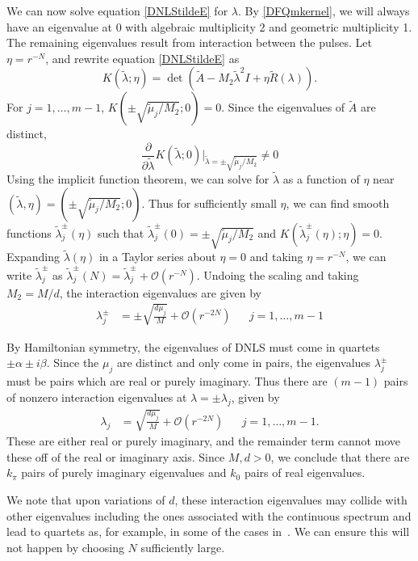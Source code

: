 \documentclass[12pt]{elsarticle}
\begin{document}
We can now solve equation \eqref{DNLStildeE} for $\lambda$. By \eqref{DFQmkernel}, we will always have an eigenvalue at 0 with algebraic multiplicity 2 and geometric multiplicity 1. The remaining eigenvalues result from interaction between the pulses. Let $\eta = r^{-N}$, and rewrite equation \eqref{DNLStildeE} as 
\begin{equation}\label{DNLStildeE2}
K(\tilde{\lambda}; \eta) = \det(\tilde{A} - M_2 \tilde{\lambda}^2 I + \eta \tilde{R}(\lambda)).
\end{equation}
For $j = 1, \dots, m-1$, $K(\pm \sqrt{\tilde{\mu}_j / M_2 }; 0) = 0$. Since the eigenvalues of $\tilde{A}$ are distinct, 
\[
\frac{\partial}{\partial \tilde{\lambda}} K(\tilde{\lambda}; 0)\Big|_{\tilde{\lambda} = \pm \sqrt{\tilde{\mu}_j / M_2 }} \neq 0
\]
Using the implicit function theorem, we can solve for $\tilde{\lambda}$ as a function of $\eta$ near $(\tilde{\lambda}, \eta) = (\pm \sqrt{\tilde{\mu}_j / M_2 }; 0)$. Thus for sufficiently small $\eta$, we can find smooth functions $\tilde{\lambda}_j^\pm(\eta)$ such that $\tilde{\lambda}_j^\pm(0) = \pm \sqrt{\tilde{\mu}_j / M_2 }$ and $K(\tilde{\lambda}_j^\pm(\eta); \eta) = 0$. Expanding $\tilde{\lambda}(\eta)$ in a Taylor series about $\eta = 0$ and taking $\eta = r^{-N}$, we can write $\tilde{\lambda}_j^\pm$ as $\tilde{\lambda}_j^\pm(N) = \tilde{\lambda}_j^\pm + \mathcal{O}(r^{-N})$. Undoing the scaling and taking $M_2 = M/d$, the interaction eigenvalues are given by
\begin{align*}
\lambda^\pm_j &= \pm \sqrt{\frac{d \mu_j}{M}} + \mathcal{O}(r^{-2N}) && j = 1, \dots, m-1 
\end{align*}

By Hamiltonian symmetry, the eigenvalues of DNLS must come in quartets $\pm \alpha \pm i \beta$. Since the $\mu_j$ are distinct and only come in pairs, the eigenvalues $\lambda_j^\pm$ must be pairs which are real or purely imaginary. Thus there are $(m - 1)$ pairs of nonzero interaction eigenvalues at $\lambda = \pm \lambda_j$, given by 
\begin{align*}
\lambda_j &= \sqrt{\frac{d \mu_j}{M}} + \mathcal{O}(r^{-2N}) && j = 1, \dots, m-1.
\end{align*}
These are either real or purely imaginary, and the remainder term cannot move these off of the real or imaginary axis. Since $M, d > 0$, we conclude that there are $k_\pi$ pairs of purely imaginary eigenvalues and $k_0$ pairs of real eigenvalues.

We note that upon variations of $d$,
these interaction eigenvalues may collide with other eigenvalues including
the ones associated with the continuous spectrum
and lead to quartets as, for example, in some of the
cases in~\cite{Pelinovsky2005}. We can ensure this will not happen by choosing $N$ sufficiently large.
\end{document}
